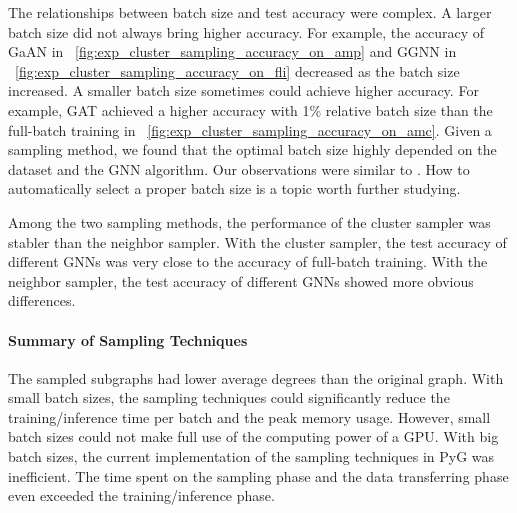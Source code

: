 The relationships between batch size and test accuracy were complex.
%
A larger batch size did not always bring higher accuracy.
%
For example, the accuracy of GaAN in \figurename~\ref{fig:exp_cluster_sampling_accuracy_on_amp} and GGNN in \figurename~\ref{fig:exp_cluster_sampling_accuracy_on_fli} decreased as the batch size increased.
%
A smaller batch size sometimes could achieve higher accuracy.
%
For example, GAT achieved a higher accuracy with 1\% relative batch size than the full-batch training in \figurename~\ref{fig:exp_cluster_sampling_accuracy_on_amc}.
%
Given a sampling method, we found that the optimal batch size highly depended on the dataset and the GNN algorithm.
%
Our observations were similar to \cite{zeng2020_graphsaint}.
%
How to automatically select a proper batch size is a topic worth further studying.

Among the two sampling methods, the performance of the cluster sampler was stabler than the neighbor sampler.
%
With the cluster sampler, the test accuracy of different GNNs was very close to the accuracy of full-batch training.
%
With the neighbor sampler, the test accuracy of different GNNs showed more obvious differences.

\paragraph{Summary of Sampling Techniques}
% 
The sampled subgraphs had lower average degrees than the original graph.
%
With small batch sizes, the sampling techniques could significantly reduce the training/inference time per batch and the peak memory usage.
%
However, small batch sizes could not make full use of the computing power of a GPU.
%
With big batch sizes, the current implementation of the sampling techniques in PyG was inefficient.
%
The time spent on the sampling phase and the data transferring phase even exceeded the training/inference phase.
